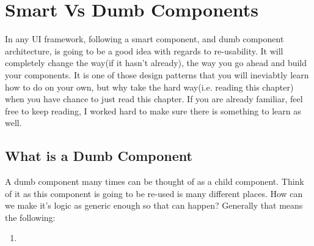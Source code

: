 \maketitle{}
\section{ Smart Vs Dumb Components }

In any UI framework, following a smart component, and dumb component
architecture, is going to be a good idea with regards to re-usability.  It will
completely change the way(if it hasn't already), the way you go ahead and build
your components. It is one of those design patterns that you will ineviabtly
learn how to do on your own, but why take the hard way(i.e. reading this chapter)
when you have chance to just read this chapter. If you are already familiar,
feel free to keep reading, I worked hard to make sure there is something to
learn as well.

\subsection{ What is a Dumb Component }
A dumb component many times can be thought of as a child component. Think of it
as this component is going to be re-used is many different places. How can we
make it's logic as generic enough so that can happen? Generally that means the
following:
\begin{enumerate}
  \item 
\end{enumerate}

